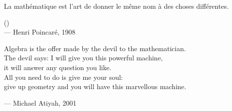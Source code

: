 \begin{flushright}
\itshape
\begin{hangleftquote}{\QFROpen}{\QFRClose}
La mathématique est l'art de donner le même nom à des choses différentes.
\end{hangleftquote}
\par\smallskip
\normalfont () \\
 — Henri Poincaré, 1908
\end{flushright}
\vspace{2em}
\begin{flushright}
\begin{hangleftquote}{\QENOpen}{\QENClose}
Algebra is the offer made by the devil to the mathematician.\\
The devil says: I will give you this powerful machine,\\
it will answer any question you like.\\
All you need to do is give me your soul:\\
give up geometry and you will have this marvellous machine.
\end{hangleftquote}
\par\smallskip
\normalfont — Michael Atiyah, 2001
\end{flushright}
